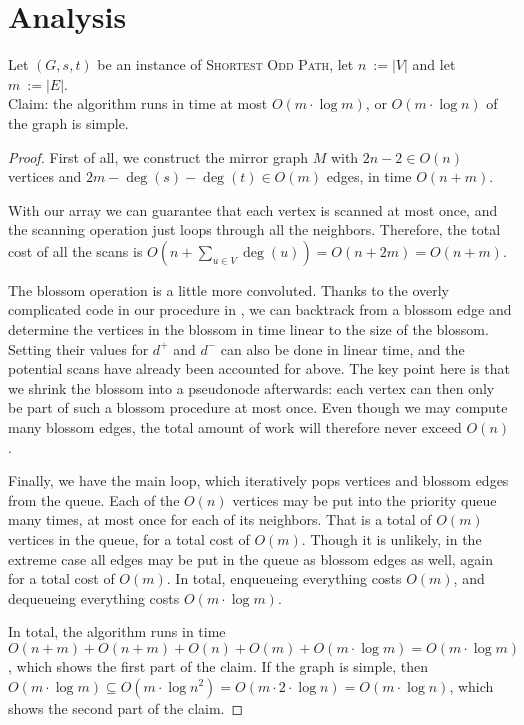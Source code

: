 \section{Analysis}
\begin{theorem}
    Let $(G,s,t)$ be an instance of \textsc{Shortest Odd Path}, let $n~:= |V|$ and let $m~:= |E|$. \\
    Claim: the algorithm runs in time at most $O(m \cdot \log m)$, or $O(m \cdot \log n)$ of the graph is simple.
    \begin{proof}  
        First of all, we construct the mirror graph $M$ with $2n-2 \in O(n)$ vertices and $2m - \deg(s) - \deg(t) \in O(m)$ edges, in time $O(n+m)$.
        
        With our  array we can guarantee that each vertex is scanned at most once, and the scanning operation just loops through all the neighbors. Therefore, the total cost of all the scans is $O(n + \sum_{u \in V} \deg(u)) = O(n + 2m) = O(n + m)$.
    
        The blossom operation is a little more convoluted. Thanks to the overly complicated code in our  procedure in , we can backtrack from a blossom edge and determine the vertices in the blossom in time linear to the size of the blossom. Setting their values for $d^+$ and $d^-$ can also be done in linear time, and the potential scans have already been accounted for above. The key point here is that we shrink the blossom into a pseudonode afterwards: each vertex can then only be part of such a blossom procedure at most once. Even though we may compute many blossom edges, the total amount of work will therefore never exceed $O(n)$.
    
        Finally, we have the main loop, which iteratively pops vertices and blossom edges from the queue. Each of the $O(n)$ vertices may be put into the priority queue many times, at most once for each of its neighbors. That is a total of $O(m)$ vertices in the queue, for a total cost of $O(m)$. Though it is unlikely, in the extreme case all edges may be put in the queue as blossom edges as well, again for a total cost of $O(m)$. In total, enqueueing everything costs $O(m)$, and dequeueing everything costs $O(m \cdot \log m)$.
    
        In total, the algorithm runs in time $O(n+m) + O(n+m) + O(n) + O(m) + O(m \cdot \log m) = O(m \cdot \log m)$, which shows the first part of the claim. If the graph is simple, then $O(m \cdot \log m) \subseteq O(m \cdot \log n^2) = O(m \cdot 2 \cdot \log n) = O(m \cdot \log n)$, which shows the second part of the claim.
    \end{proof}        
\end{theorem}

